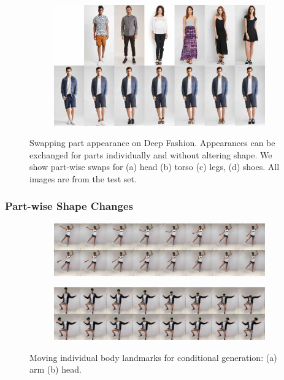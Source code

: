\begin{frame}[t]
\begin{figure}[htp]
\begin{subfigure}{0.49\linewidth}
				\label{fig:part3_21}
				\end{subfigure}
				\begin{subfigure}{0.49\linewidth}
				\centering
				\includegraphics[trim={0cm 0cm 0cm 0cm},clip, width=1.\linewidth]{fig/factor/part6_30}\caption{}
				\label{fig:part3_30}
				\end{subfigure}
				\caption{Swapping part appearance on Deep Fashion. Appearances can be exchanged for parts individually and without altering shape. We show part-wise swaps for (a) head (b) torso (c) legs, (d) shoes. All images are from the test set.}
				\label{fig:partswaps}
			\end{figure}
		\end{frame}

		\begin{frame}[t]
		\frametitle{Part-wise Shape Changes}
			\begin{figure}[htp]
				\centering
				\begin{subfigure}{1.\linewidth}
					\includegraphics[trim={0cm 0cm 0cm 0cm},clip, width=1.0\linewidth]{fig/factor/8arm}\caption{}
				\end{subfigure}
				\begin{subfigure}{1.\linewidth}
					\includegraphics[trim={0cm 0cm 0cm 0cm},clip, width=1.0\linewidth]{fig/factor/8head}\caption{}
				\end{subfigure}
				\caption{Moving individual body landmarks for conditional generation: (a) arm (b) head.}
				\label{fig:movekp}
			\end{figure}
		\end{frame}

